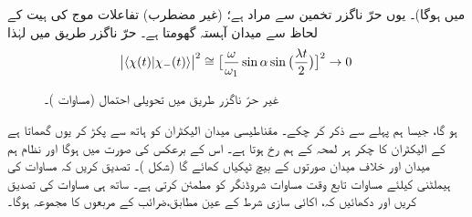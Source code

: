 میں  ہوگا)۔ یوں حرّ ناگزر تخمین سے مراد  ہے؛ (غیر مضطرب) تفاعلات موج کی ہیت کے لحاظ سے میدان آہستہ گھومتا ہے۔ حرّ ناگزر طریق میں  لہٰذا 
\begin{align}
\abs{\langle \chi (t) | \chi_{-} (t) \rangle}^2 \cong \big [ \frac{\omega}{\omega_1} \sin \alpha \sin \big ( \frac{\lambda t}{2} \big ) \big ]^2 \to 0
\end{align}
%
\begin{figure}
\centering
{}
\caption{غیر حرّ ناگزر طریق  میں تحویلی احتمال (مساوات )۔}
\label{شکل_حرارت_نا_گزر_تحویلی_احتمال}
\end{figure}

ہو گا، جیسا ہم پہلے سے ذکر کر چکے۔ مقناطیسی میدان الیکٹران کو ہاتھ سے پکڑ کر یوں گھماتا ہے کے الیکٹران کا چکر ہر لمحہ  کے ہم رخ ہوتا ہے۔ اس کے
 برعکس  کی صورت میں  ہوگا اور نظام ہم میدان اور خلاف میدان صورتوں کے بیچ ٹپکیاں کھائے گا (شکل )۔
تصدیق کریں کہ مساوات  کی ہیملٹنی کیلئے مساوات  تابع وقت مساوات شروڈنگر کو مطمئن کرتی ہے۔ ساتھ ہی مساوات 
 کی تصدیق کریں اور دکھائیں کہ، اکائی سازی شرط کے عین مطابق،ضرائب کے مربعوں کا مجموعہ  ہوگا۔

